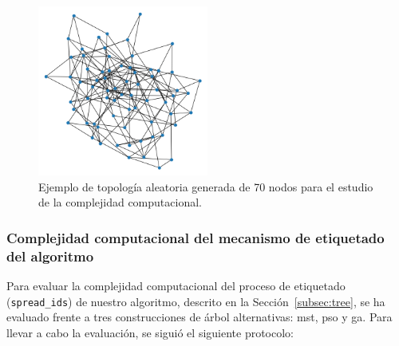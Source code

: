 \begin{figure}[ht!]
    \centering
    \includegraphics[width=0.5\textwidth]{fig/07_bloste/bloste_22.png}
    \caption{Ejemplo de topología aleatoria generada de 70 nodos para el estudio de la complejidad computacional.}
    \label{fig:topology_random_70}
\end{figure}


\subsubsection{Complejidad computacional del mecanismo de etiquetado del algoritmo}
\label{subsubsec:ccomplexSpread}

Para evaluar la complejidad computacional del proceso de etiquetado (\texttt{spread\_ids}) de nuestro algoritmo, descrito en la Sección~\ref{subsec:tree}, se ha evaluado frente a tres construcciones de árbol alternativas:  \gls{mst}, \gls{pso} y \gls{ga}. Para llevar a cabo la evaluación, se siguió el siguiente protocolo:

